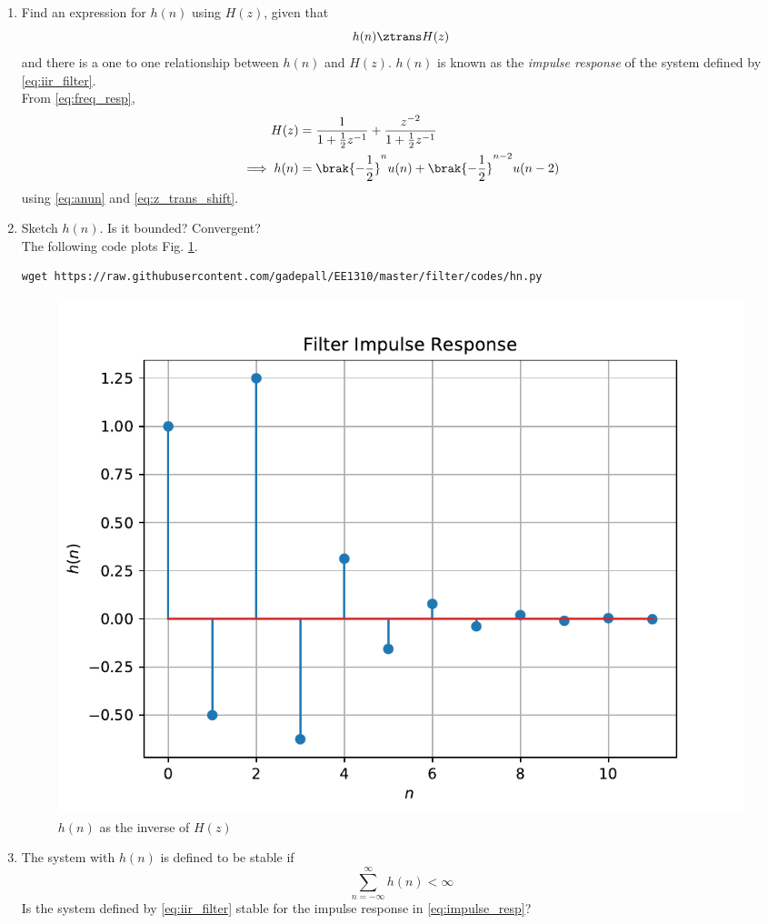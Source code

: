 \documentclass[journal,12pt,twocolumn]{IEEEtran}
\renewcommand\thesection{\arabic{section}}
\begin{document}
\begin{enumerate}[label=\thesection.\arabic*]
\item \label{prob:impulse_resp}
Find an expression for $h(n)$ using $H(z)$, given that 
\begin{equation}
\label{eq:impulse_resp}
h(n) \ztrans H(z)
\end{equation}
and there is a one to one relationship between $h(n)$ and $H(z)$. $h(n)$ is known as the {\em impulse response} of the
system defined by \eqref{eq:iir_filter}.
\\
\solution From \eqref{eq:freq_resp},\\
\begin{align}
H(z) &= \frac{1}{1 + \frac{1}{2}z^{-1}} + \frac{ z^{-2}}{1 + \frac{1}{2}z^{-1}}
\\
\implies h(n) &= \brak{-\frac{1}{2}}^{n}u(n) + \brak{-\frac{1}{2}}^{n-2}u(n-2) \label{eq:h(n)}
\end{align}
using \eqref{eq:anun} and \eqref{eq:z_trans_shift}.
\item Sketch $h(n)$. Is it bounded? Convergent? 
\\
\solution The following code plots Fig. \ref{fig:hn}.
\begin{lstlisting}
wget https://raw.githubusercontent.com/gadepall/EE1310/master/filter/codes/hn.py
\end{lstlisting}
\begin{figure}[!ht]
\centering
\includegraphics[width=\columnwidth]{./figs/hn}
\caption{$h(n)$ as the inverse of $H(z)$}
\label{fig:hn}
\end{figure}
%
\item The system with $h(n)$ is defined to be stable if
\begin{equation}
\sum_{n=-\infty}^{\infty}h(n) < \infty
\end{equation}
Is the system defined by \eqref{eq:iir_filter} stable for the impulse response in \eqref{eq:impulse_resp}?
%


\end{enumerate}
\end{document}
